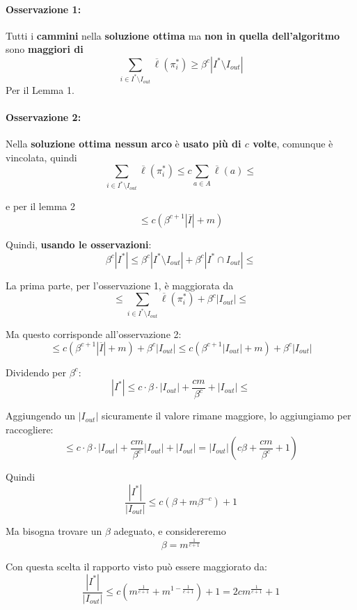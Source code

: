\paragraph{Osservazione 1:} Tutti i \textbf{cammini} nella \textbf{soluzione ottima} ma \textbf{non in quella dell'algoritmo} sono \textbf{maggiori di}
$$ \sum_{i \in I^\ast \setminus I_{out}} \overline{\ell} (\pi_i^\ast) \geq \beta^c |I^\ast \setminus I_{out}|$$
Per il Lemma 1.\\

\paragraph{Osservazione 2:} Nella \textbf{soluzione ottima nessun arco} è \textbf{usato più di $c$ volte}, comunque è vincolata, quindi
$$ \sum_{i \in I^\ast \setminus I_{out}} \overline{\ell}(\pi_i^\ast) \leq c \sum_{a \in A} \overline{\ell} (a) \leq $$

e per il lemma 2 
$$ \leq c \left( \beta^{c+1}|\overline{I}| + m \right) $$

\nn 
Quindi, \textbf{usando le osservazioni}: 
$$ \beta^c |I^\ast| \leq \beta^c |I^\ast \setminus I_{out}| + \beta^c |I^\ast \cap I_{out}| \leq $$

La prima parte, per l'osservazione 1, è maggiorata da
$$ \leq \sum_{i \in I^\ast \setminus I_{out}} \overline{\ell} (\pi_i^\ast) + \beta^c |I_{out}| \leq $$

Ma questo corrisponde all'osservazione 2:
$$ \leq c \left( \beta^{c+1}|\overline{I}| + m \right) + \beta^c |I_{out}| \leq  c \left( \beta^{c+1}|I_{out}| + m \right) + \beta^c |I_{out}| $$

Dividendo per $\beta^c$:
$$ |I^\ast| \leq c \cdot \beta \cdot |I_{out}| + \frac{cm}{\beta^c} + |I_{out}| \leq $$

Aggiungendo un $|I_{out}|$ sicuramente il valore rimane maggiore, lo aggiungiamo per raccogliere:
$$ \leq c \cdot \beta \cdot |I_{out}| + \frac{cm}{\beta^c} |I_{out}| + |I_{out}| = |I_{out}| \left(c \beta + \frac{cm}{\beta^c} + 1\right) $$

Quindi
$$ \frac{|I^\ast|}{|I_{out}|} \leq c \left(\beta + m \beta^{-c}\right) + 1$$

Ma bisogna trovare un $\beta$ adeguato, e considereremo
$$ \beta = m^{\frac{1}{c+1}}$$

Con questa scelta il rapporto visto può essere maggiorato da:  
$$ \frac{|I^\ast|}{|I_{out}|} \leq c \left(m^{\frac{1}{c+1}} + m^{1-\frac{1}{c+1}}\right) + 1 = 2c m^{\frac{1}{c+1}} + 1 $$

